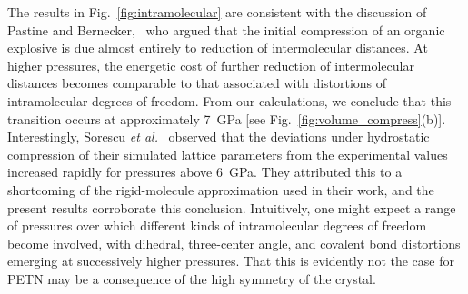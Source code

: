\documentclass[prb,aps,nobibnotes,superbib,preprint]{revtex4}
\begin{document}
The results in Fig.~\ref{fig:intramolecular} are consistent with the
discussion of Pastine and Bernecker,~\cite{Pastine_1974v45} who argued
that the initial compression of an organic explosive is due almost
entirely to reduction of intermolecular distances.  At higher
pressures, the energetic cost of further reduction of intermolecular
distances becomes comparable to that associated with distortions of
intramolecular degrees of freedom.  From our calculations, we conclude
that this transition occurs at approximately 7~GPa [see
Fig.~\ref{fig:volume_compress}(b)].  Interestingly, Sorescu {\it et
al.}~\cite{Sorescu_1999v103} observed that the deviations under
hydrostatic compression of their simulated lattice parameters from the
experimental values increased rapidly for pressures above 6~GPa.  They
attributed this to a shortcoming of the rigid-molecule approximation
used in their work, and the present results corroborate this
conclusion.  Intuitively, one might expect a range of pressures over
which different kinds of intramolecular degrees of freedom become
involved, with dihedral, three-center angle, and covalent bond
distortions emerging at successively higher pressures.  That this is
evidently not the case for PETN may be a consequence of the high
symmetry of the crystal.
\end{document}
